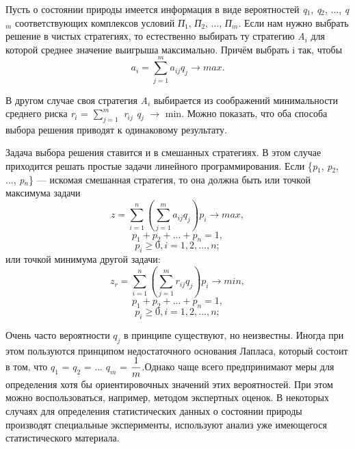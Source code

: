 Пусть о состоянии природы имеется информация в виде вероятностей \emph{q$_{1}$}, \emph{q$_{2}$}, ..., \emph{q$_{m}$} соответствующих комплексов условий \emph{П$_{1}$}, \emph{П$_{2}$}, ..., \emph{П$_{m}$}. Если нам нужно выбрать решение в чистых стратегиях, то естественно выбирать ту стратегию \emph{A$_{i}$} для которой среднее значение  выигрыша  максимально. Причём выбрать  i так, чтобы \begin{equation}
\label{equation_4_53}
   a_i = \sum\limits_{j=1}^m a_{ij} q_j \rightarrow max.
\end{equation}

В другом случае своя стратегия \emph{A$_{i}$} выбирается из соображений минимальности среднего риска \emph{r$_{i}$} = $\sum\limits_{j=1}^m$ \emph{r$_{ij}$} \emph{q$_{j}$} $\rightarrow$ min. Можно показать, что оба способа выбора решения приводят к одинаковому результату.

Задача выбора решения ставится и в смешанных стратегиях. В этом случае приходится решать простые задачи линейного программирования. Если \{\emph{p$_1$}, \emph{p$_2$}, ..., \emph{p$_n$}\} — искомая смешанная  стратегия, то она должна быть или точкой максимума задачи
\begin{equation}
\label{equation_4_54}
   z = \sum\limits_{i=1}^n (\sum\limits_{j=1}^m a_{ij} q_j) p_i \rightarrow max,
\end{equation}
\begin{equation}
\label{equation_4_55}
   p_1 + p_2 + ... + p_n = 1,
\end{equation}
\begin{equation}
\label{equation_4_56}
   p_i \geqslant 0, i = 1, 2, ..., n;
\end{equation}
или точкой минимума другой задачи:
\begin{equation}
\label{equation_4_57}
   z_r = \sum\limits_{i=1}^n (\sum\limits_{j=1}^m r_{ij} q_j) p_i \rightarrow min,
\end{equation}
\begin{equation}
\label{equation_4_58}
   p_1 + p_2 + ... + p_n = 1,
\end{equation}
\begin{equation}
\label{equation_4_59}
   p_i \geqslant 0, i = 1, 2, ..., n;
\end{equation}

Очень часто вероятности $q_j$ в принципе существуют,  но неизвестны. Иногда при этом пользуются принципом недостаточного основания Лапласа, который состоит в том, что $q_1$ = $q_2$ = ... $q_m$ = $\displaystyle{{1}\over{m}}$.Однако чаще  всего предпринимают меры для определения хотя бы ориентировочных значений этих вероятностей. При этом можно  воспользоваться, например, методом экспертных оценок. В некоторых случаях для определения статистических данных о состоянии природы производят специальные эксперименты, используют анализ уже имеющегося статистического материала.

